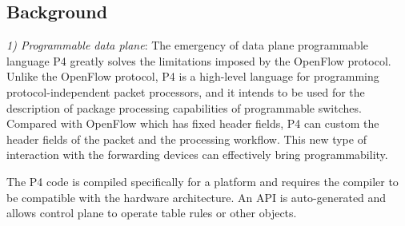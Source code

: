 \documentclass[10pt,conference]{IEEEtran}
\begin{document}
\subsection{Background}\label{ppo}

%

\emph{1) Programmable data plane}: The emergency of data plane programmable language P4\cite{p42014} greatly solves the limitations imposed by the OpenFlow protocol. Unlike the OpenFlow protocol, P4 is a high-level language for programming protocol-independent packet processors, and it intends to be used for the description of package processing capabilities of programmable switches. Compared with OpenFlow which has fixed header fields, P4 can custom the header fields of the packet and the processing workflow. This new type of interaction with the forwarding devices can effectively bring programmability.

The P4 code is compiled specifically for a platform and requires the compiler to be compatible with the hardware architecture. An API is auto-generated and allows control plane to operate table rules or other objects.
\end{document}
